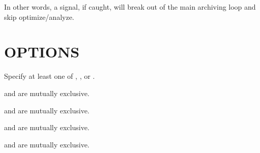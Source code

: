 \documentclass[letterpaper,10pt,english]{sphinxmanual}
\begin{document}
\sphinxAtStartPar
In other words, a signal, if caught, will break out of the main archiving
loop and skip optimize/analyze.


\section{OPTIONS}
\label{\detokenize{mariadb-archiver:options}}
\sphinxAtStartPar
Specify at least one of {\hyperref[\detokenize{mariadb-archiver:cmdoption-mariadb-archiver-dest}]{}}, {\hyperref[\detokenize{mariadb-archiver:cmdoption-mariadb-archiver-file}]{}}, or {\hyperref[\detokenize{mariadb-archiver:cmdoption-mariadb-archiver-purge}]{}}.

\sphinxAtStartPar
{\hyperref[\detokenize{mariadb-archiver:cmdoption-mariadb-archiver-ignore}]{}} and {\hyperref[\detokenize{mariadb-archiver:cmdoption-mariadb-archiver-replace}]{}} are mutually exclusive.

\sphinxAtStartPar
{\hyperref[\detokenize{mariadb-archiver:cmdoption-mariadb-archiver-txn-size}]{}} and {\hyperref[\detokenize{mariadb-archiver:cmdoption-mariadb-archiver-commit-each}]{}} are mutually exclusive.

\sphinxAtStartPar
{\hyperref[\detokenize{mariadb-archiver:cmdoption-mariadb-archiver-low-priority-insert}]{}} and {\hyperref[\detokenize{mariadb-archiver:cmdoption-mariadb-archiver-delayed-insert}]{}} are mutually exclusive.

\sphinxAtStartPar
{\hyperref[\detokenize{mariadb-archiver:cmdoption-mariadb-archiver-share-lock}]{}} and {\hyperref[\detokenize{mariadb-archiver:cmdoption-mariadb-archiver-for-update}]{}} are mutually exclusive.
\end{document}
